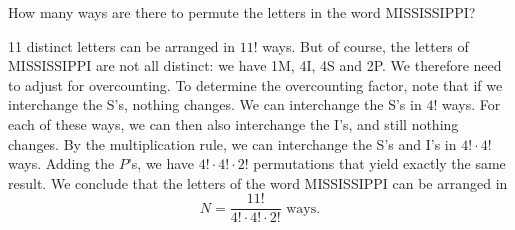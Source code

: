 
\setcounter{theorem}{0}

\begin{exercise} [BH.1.1]
	How many ways are there to permute the letters in the word MISSISSIPPI?
\begin{solution}
	11 distinct letters can be arranged in $11!$ ways. But of course, the letters of MISSISSIPPI are not all distinct: we have 1M, 4I, 4S and 2P. We therefore need to adjust for overcounting. To determine the overcounting factor, note that if we interchange the S's, nothing changes. We can interchange the S's in $4!$ ways. For each of these ways, we can then also interchange the I's, and still nothing changes. By the multiplication rule, we can interchange the S's and I's in $4!\cdot 4!$ ways. Adding the $P$'s, we have $4!\cdot 4!\cdot 2!$ permutations that yield exactly the same result. We conclude that the letters of the word MISSISSIPPI can be arranged in $$N=\frac{11!}{4!\cdot 4!\cdot 2!}\text{ ways.}$$
\end{solution}
\end{exercise}


